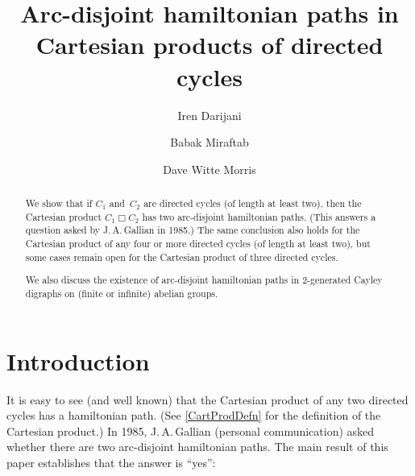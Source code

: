 \documentclass[11pt]{amsart}
\theoremstyle{definition}
\newcounter{case}
\numberwithin{case}{startcases}
\newcommand\thankssymb[1]{\textsuperscript{{#1}}}
\numberwithin{equation}{section}
\newcommand{\cartprod}{\mathbin{\Box}}
\begin{document}
	
	\title[Arc-disjoint hamiltonian paths in Cartesian products]{Arc-disjoint hamiltonian paths in \\ Cartesian products of directed cycles}
	
	\author{Iren Darijani}
	
	\author{Babak Miraftab}
	
	\author{Dave Witte Morris}
	
	\address{Department of Mathematics and Computer Science, University of Lethbridge, 4401 University
		Drive, Lethbridge, Alberta, T1K 3M4, Canada}
	
	\begin{abstract}
		We show that if $C_1$ and~$C_2$ are directed cycles (of length at least two), then the Cartesian product $C_1 \cartprod C_2$ has two arc-disjoint hamiltonian paths. (This answers a question asked by J.\,A.\,Gallian in 1985.) The same conclusion also holds for the Cartesian product of any four or more directed cycles (of length at least two), but some cases remain open for the Cartesian product of three directed cycles.
		
		We also discuss the existence of arc-disjoint hamiltonian paths in $2$-generated Cayley digraphs on (finite or infinite) abelian groups.
	\end{abstract}
	
	\maketitle
	
	\tableofcontents
	
	\section{Introduction} \label{IntroSect}
	
	It is easy to see (and well known) that the Cartesian product of any two directed cycles has a hamiltonian path. (See \cref{CartProdDefn} for the definition of the Cartesian product.) In 1985, J.\,A.\,Gallian (personal communication) asked whether there are two arc-disjoint hamiltonian paths. The main result of this paper establishes that the answer is ``yes'':
	
\end{document}
